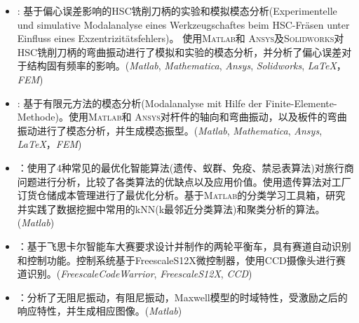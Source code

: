 \documentclass[zh]{resume}
\newcommand{\Matlab}{\textsc{Matlab}\textregistered }
\newcommand{\Ansys}{\textsc{Ansys}\textregistered }
\newcommand{\Solidworks}{\textsc{Solidworks}\textregistered }
\begin{document}
\begin{itemize}
	\setlength{\itemsep}{4pt}
	\item 
	: 
	基于偏心误差影响的HSC铣削刀柄的实验和模拟模态分析(Experimentelle und simulative Modalanalyse eines Werkzeugschaftes beim HSC-Fräsen unter Einfluss eines Exzentrizitätsfehlers)。 使用\Matlab 和 \Ansys 及\Solidworks 对HSC铣削刀柄的弯曲振动进行了模拟和实验的模态分析，并分析了偏心误差对于结构固有频率的影响。(\textit{Matlab\textregistered}, \textit{Mathematica\textregistered}, \textit{Ansys\textregistered}, \textit{Solidworks\textregistered}, \textit{\LaTeX}，\textit{FEM})
	
	\item 
	: 
	基于有限元方法的模态分析(Modalanalyse mit Hilfe der Finite-Elemente-Methode)。使用\Matlab 和 \Ansys 对杆件的轴向和弯曲振动，以及板件的弯曲振动进行了模态分析，并生成模态振型。(\textit{Matlab\textregistered}, \textit{Mathematica\textregistered}, \textit{Ansys\textregistered}, \textit{\LaTeX}，\textit{FEM})
	
	\item 
	：使用了4种常见的最优化智能算法(遗传、蚁群、免疫、禁忌表算法)对旅行商问题进行分析，比较了各类算法的优缺点以及应用价值。使用遗传算法对工厂订货仓储成本管理进行了最优化分析。基于\Matlab 的分类学习工具箱，研究并实践了数据挖掘中常用的kNN(k最邻近分类算法)和聚类分析的算法。(\textit{Matlab\textregistered})
	
	\item {}：基于飞思卡尔智能车大赛要求设计并制作的两轮平衡车，具有赛道自动识别和控制功能。控制系统基于Freescale\textregistered S12X微控制器，使用CCD摄像头进行赛道识别。(\textit{Freescale\textregistered CodeWarrior}, \textit{Freescale\textregistered S12X}, \textit{CCD})
	
	\item {}：分析了无阻尼振动，有阻尼振动，Maxwell模型的时域特性，受激励之后的响应特性，并生成相应图像。(\textit{Matlab\textregistered})
	
	
  		
\end{itemize}
\end{document}
